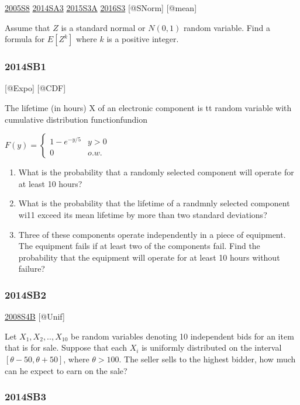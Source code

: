 \documentclass[6pt,Portrait]{article}
\begin{document}
\protect\hyperlink{s8-1}{2005S8} \protect\hyperlink{sa3-2}{2014SA3}
\protect\hyperlink{s3a-1}{2015S3A} \protect\hyperlink{s3-4}{2016S3}
{[}@SNorm{]} {[}@mean{]}

Assume that \(Z\) is a standard normal or \(N(0,1)\) random variable.
Find a formula for \(E[Z^k]\) where \(k\) is a positive integer.

\hypertarget{sb1-2}{%
\subsubsection{2014SB1}\label{sb1-2}}

{[}@Expo{]} {[}@CDF{]}

The lifetime (in hours) X of an electronic component is tt random
variable with cumulative distribution functionfundion

\(F(y)=\begin{cases}1-e^{-y/5}& y>0\\0& o.w.\end{cases}\)

\begin{enumerate}
\def\labelenumi{(\alph{enumi})}
\item
  What is the probability that a randomly selected component will
  operate for at least 10 hours?
\item
  What is the probability that the lifetime of a randmnly selected
  component wi11 exceed its mean lifetime by more than two standard
  deviations?
\item
  Three of these components operate independently in a piece of
  equipment. The equipment fails if at least two of the components fail.
  Find the probability that the equipment will operate for at least 10
  hours without failure?
\end{enumerate}

\hypertarget{sb2-2}{%
\subsubsection{2014SB2}\label{sb2-2}}

\protect\hyperlink{s4b}{2008S4B} {[}@Unif{]}

Let \(X_1,X_2,..,X_{10}\) be random variables denoting 10 independent
bids for an item that is for sale. Suppose that each \(X_i\) is
uniformly distributed on the interval \([\theta-50,\theta+50]\), where
\(\theta>100\). The seller sells to the highest bidder, how much can he
expect to earn on the sale?

\hypertarget{sb3-2}{%
\subsubsection{2014SB3}\label{sb3-2}}
\end{document}
